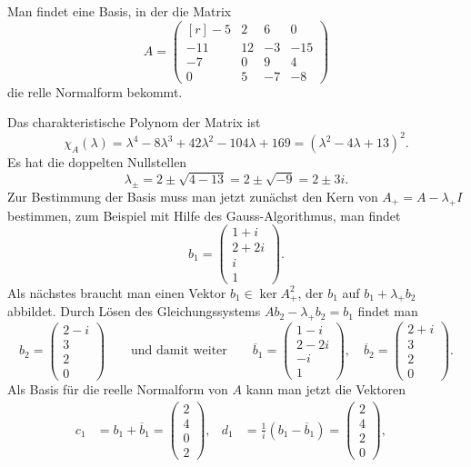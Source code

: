 Man findet eine Basis, in der die Matrix
\[
A=\begin{pmatrix*}[r]
 -5&  2&  6&   0\\
-11& 12& -3& -15\\
 -7&  0&  9&   4\\
  0&  5& -7&  -8
\end{pmatrix*}
\]
die relle Normalform bekommt.

\begin{loesung}
Das charakteristische Polynom der Matrix ist 
\[
\chi_{A}(\lambda)
=
\lambda^4-8\lambda^3+42\lambda^2-104\lambda+169
=
(\lambda^2-4\lambda+13)^2.
\]
Es hat die doppelten Nullstellen
\[
\lambda_\pm
=
2\pm \sqrt{4-13}
=
2\pm \sqrt{-9}
=
2\pm 3i.
\]
Zur Bestimmung der Basis muss man jetzt zunächst den Kern von 
$A_+=A-\lambda_+I$ bestimmen, zum Beispiel mit Hilfe des Gauss-Algorithmus,
man findet
\[
b_1
=
\begin{pmatrix}
1+i\\
2+2i\\
i\\
1
\end{pmatrix}.
\]
Als nächstes braucht man einen Vektor $b_1\in \ker A_+^2$, der 
$b_1$ auf $b_1+\lambda_+b_2$ abbildet.
Durch Lösen des Gleichungssystems $Ab_2-\lambda_+ b_2=b_1$ findet man
\[
b_2
=
\begin{pmatrix}
2-i\\3\\2\\0
\end{pmatrix}
\qquad\text{und damit weiter}\qquad
\overline{b}_1
=
\begin{pmatrix}
1-i\\
2-2i\\
-i\\
1
\end{pmatrix},\quad
\overline{b}_2
=
\begin{pmatrix}
2+i\\3\\2\\0
\end{pmatrix}.
\]
Als Basis für die reelle Normalform von $A$ kann man jetzt die Vektoren
\begin{align*}
c_1
&=
b_1+\overline{b}_1 = \begin{pmatrix}2\\4\\0\\2\end{pmatrix},&
d_1
&=
\frac{1}{i}(b_1-\overline{b}_1) = \begin{pmatrix}2\\4\\2\\0\end{pmatrix},&

\end{align*}
\end{loesung}

